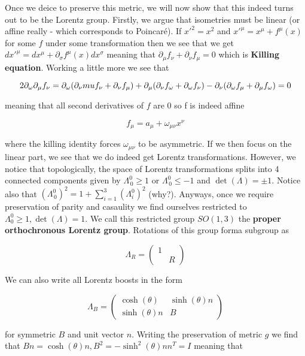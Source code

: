 \documentclass{article}
\theoremstyle{definition}
\begin{document}
Once we deice to preserve this metric, we will now show that this indeed turns
out to be the Lorentz group. Firstly, we argue that isometries must be linear
(or affine really - which corresponds to Poincar\'{e}). If $x'^2 = x^2$ and
$x'^\mu = x^\mu + f^\mu(x)$ for some $f$ under some transformation then we see
that we get  $dx'^\mu = dx^\mu + \partial_\sigma f^\mu(x) dx^\sigma$ meaning
that $\partial_\mu f_\nu + \partial_\nu f_\mu = 0$ which is \textbf{Killing
  equation}. Working a little more we see that

$$ 2\partial_\omega \partial_\mu f_\nu = \partial_\omega(\partial_\nu\\mu f_\nu
+ \partial_\nu f_\mu) + \partial_\mu (\partial_\nu f_\omega + \partial_\omega
f_\nu) - \partial_\nu(\partial_\omega f_\mu + \partial_\mu f_\omega) = 0 $$

meaning that all second derivatives of $f$ are 0 so f is indeed affine

$$ f_\mu = a_\mu + \omega_{\mu \nu} x^\nu $$

where the killing identity forces $\omega_{\mu \nu}$ to be asymmetric. If we
then focus on the linear part, we see that we do indeed get Lorentz
transformations. However, we notice that topologically, the space of Lorentz
transformations splits into 4 connected components given by $\Lambda^0_{\,0}
\geq 1$ or $\Lambda^0_{\,0} \leq -1$ and $\det(\Lambda) = \pm 1$. Notice also
that $(\Lambda^0_{\,0})^2 = 1 + \sum_{i = 1}^3 (\Lambda^0_i)^2$ (why?). Anyways,
once we require preservation of parity and casaulity we find ourselves
restricted to $\Lambda^0_0 \geq 1, \det(\Lambda) = 1$. We call this restricted
group $SO(1, 3)$ the \textbf{proper orthochronous Lorentz group}. Rotations of
this group forma  subgroup as 

$$ \Lambda_R =
\begin{pmatrix}
1 & \\
& R 
\end{pmatrix} $$

We can also write all Lorentz boosts in the form

$$ \Lambda_B = 
\begin{pmatrix}
\cosh(\theta) & \sinh(\theta) n \\
\sinh(\theta) n & B 
\end{pmatrix} $$

for symmetric $B$ and unit vector $n$. Writing the preservation of metric $g$ we
find that $Bn = \cosh(\theta)n, B^2 = -\sinh^2(\theta) n n^T = I$ meaning that
\end{document}
